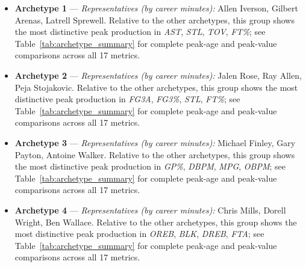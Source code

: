\begin{itemize}
\item \textbf{Archetype 1} --- \emph{Representatives (by career minutes):} Allen Iverson, Gilbert Arenas, Latrell Sprewell. Relative to the other archetypes, this group shows the most distinctive peak production in \textit{AST}, \textit{STL}, \textit{TOV}, \textit{FT\%}; see Table~\ref{tab:archetype_summary} for complete peak-age and peak-value comparisons across all 17 metrics.
\item \textbf{Archetype 2} --- \emph{Representatives (by career minutes):} Jalen Rose, Ray Allen, Peja Stojakovic. Relative to the other archetypes, this group shows the most distinctive peak production in \textit{FG3A}, \textit{FG3\%}, \textit{STL}, \textit{FT\%}; see Table~\ref{tab:archetype_summary} for complete peak-age and peak-value comparisons across all 17 metrics.
\item \textbf{Archetype 3} --- \emph{Representatives (by career minutes):} Michael Finley, Gary Payton, Antoine Walker. Relative to the other archetypes, this group shows the most distinctive peak production in \textit{GP\%}, \textit{DBPM}, \textit{MPG}, \textit{OBPM}; see Table~\ref{tab:archetype_summary} for complete peak-age and peak-value comparisons across all 17 metrics.
\item \textbf{Archetype 4} --- \emph{Representatives (by career minutes):} Chris Mills, Dorell Wright, Ben Wallace. Relative to the other archetypes, this group shows the most distinctive peak production in \textit{OREB}, \textit{BLK}, \textit{DREB}, \textit{FTA}; see Table~\ref{tab:archetype_summary} for complete peak-age and peak-value comparisons across all 17 metrics.
\end{itemize}
